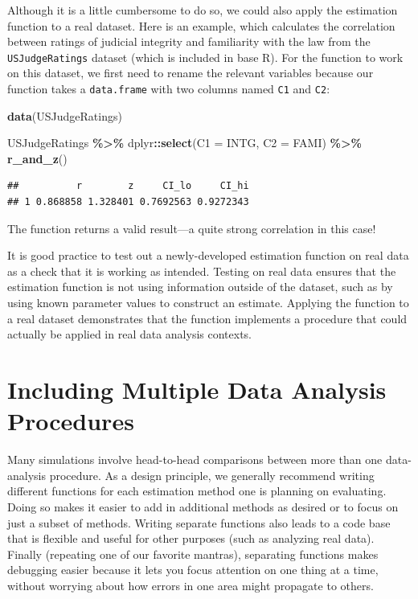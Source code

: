 \documentclass[
]{book}
\newenvironment{Shaded}{\begin{snugshade}}{\end{snugshade}}
\newcommand{\AttributeTok}[1]{\textcolor[rgb]{0.13,0.29,0.53}{#1}}
\newcommand{\FunctionTok}[1]{\textcolor[rgb]{0.13,0.29,0.53}{\textbf{#1}}}
\newcommand{\NormalTok}[1]{#1}
\newcommand{\SpecialCharTok}[1]{\textcolor[rgb]{0.81,0.36,0.00}{\textbf{#1}}}
\begin{document}
Although it is a little cumbersome to do so, we could also apply the estimation function to a real dataset.
Here is an example, which calculates the correlation between ratings of judicial integrity and familiarity with the law from the \texttt{USJudgeRatings} dataset (which is included in base R).
For the function to work on this dataset, we first need to rename the relevant variables because our function takes a \texttt{data.frame} with two columns named \texttt{C1} and \texttt{C2}:

\begin{Shaded}
\begin{Highlighting}[]
\FunctionTok{data}\NormalTok{(USJudgeRatings)}

\NormalTok{USJudgeRatings }\SpecialCharTok{\%\textgreater{}\%}
\NormalTok{  dplyr}\SpecialCharTok{::}\FunctionTok{select}\NormalTok{(}\AttributeTok{C1 =}\NormalTok{ INTG, }\AttributeTok{C2 =}\NormalTok{ FAMI) }\SpecialCharTok{\%\textgreater{}\%}
  \FunctionTok{r\_and\_z}\NormalTok{()}
\end{Highlighting}
\end{Shaded}

\begin{verbatim}
##          r        z     CI_lo     CI_hi
## 1 0.868858 1.328401 0.7692563 0.9272343
\end{verbatim}

The function returns a valid result---a quite strong correlation in this case!

It is good practice to test out a newly-developed estimation function on real data as a check that it is working as intended.
Testing on real data ensures that the estimation function is not using information outside of the dataset, such as by using known parameter values to construct an estimate.
Applying the function to a real dataset demonstrates that the function implements a procedure that could actually be applied in real data analysis contexts.

\section{Including Multiple Data Analysis Procedures}\label{multiple-estimation-procedures}

Many simulations involve head-to-head comparisons between more than one data-analysis procedure.
As a design principle, we generally recommend writing different functions for each estimation method one is planning on evaluating.
Doing so makes it easier to add in additional methods as desired or to focus on just a subset of methods.
Writing separate functions also leads to a code base that is flexible and useful for other purposes (such as analyzing real data).
Finally (repeating one of our favorite mantras), separating functions makes debugging easier because it lets you focus attention on one thing at a time, without worrying about how errors in one area might propagate to others.
\end{document}
